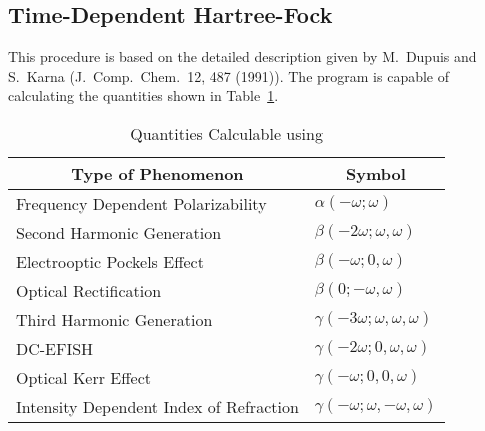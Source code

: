 \subsection{Time-Dependent Hartree-Fock}
This procedure is based on the detailed description given by
M.\ Dupuis and S.\ Karna (J.\ Comp.\ Chem.\ 12, 487 (1991)). The
program is capable of calculating the quantities shown in Table~\ref{nlo}.
\begin{table}
\caption{\label{nlo} Quantities Calculable using }
\begin{center}
\begin{tabular}{ll}\hline
\multicolumn{1}{c}{Type of Phenomenon} & \multicolumn{1}{c}{Symbol} \\ \hline
Frequency Dependent Polarizability   &   $\alpha(-\omega;\omega)$ \\
Second Harmonic Generation           &   $\beta(-2\omega;\omega,\omega)$ \\
Electrooptic Pockels Effect          &   $\beta(-\omega;0,\omega)$ \\
Optical Rectification                &   $\beta(0;-\omega,\omega)$ \\
Third Harmonic Generation            &   $\gamma(-3\omega;\omega,\omega,\omega)$  \\
DC-EFISH                             &   $\gamma(-2\omega;0,\omega,\omega)$  \\
Optical Kerr Effect                  &  $\gamma(-\omega;0,0,\omega)$  \\
Intensity Dependent Index of Refraction & $\gamma(-\omega;\omega,-\omega,\omega)$ \\
\hline
\end{tabular}
\end{center}
\end{table}

